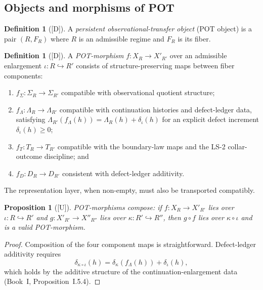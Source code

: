 \documentclass[12pt,oneside]{amsbook}
\theoremstyle{plain}
\newtheorem{proposition}[theorem]{Proposition}
\theoremstyle{definition}
\newtheorem{definition}[theorem]{Definition}
\theoremstyle{remark}
\newcommand{\status}[1]{\textup{[#1]}}
\begin{document}
\subsection*{Objects and morphisms of POT}

\begin{definition}[\status{D}]\label{def:POT-object}
A \emph{persistent observational-transfer object} (POT object) is a
pair $(R, F_R)$ where $R$ is an admissible regime and $F_R$ is its
fiber.
\end{definition}

\begin{definition}[\status{D}]\label{def:POT-morphism}
A \emph{POT-morphism} $f: X_R \to X'_{R'}$ over an admissible
enlargement $\iota: R \hookrightarrow R'$ consists of
structure-preserving maps between fiber components:
\begin{enumerate}[label=\textup{(\arabic*)}]
  \item $f_\Sigma: \Sigma_R \to \Sigma_{R'}$ compatible with
        observational quotient structure;
  \item $f_\Lambda: \Lambda_R \to \Lambda_{R'}$ compatible with
        continuation histories and defect-ledger data, satisfying
        $\Lambda_{R'}(f_\Lambda(h)) = \Lambda_R(h) + \delta_\iota(h)$
        for an explicit defect increment $\delta_\iota(h) \geq 0$;
  \item $f_T: T_R \to T_{R'}$ compatible with the boundary-law maps
        and the LS-2 collar-outcome discipline; and
  \item $f_D: D_R \to D_{R'}$ consistent with defect-ledger
        additivity.
\end{enumerate}
The representation layer, when non-empty, must also be transported
compatibly.
\end{definition}

\begin{proposition}[\status{U}]\label{prop:POT-compose}
POT-morphisms compose: if $f: X_R \to X'_{R'}$ lies over $\iota:
R \hookrightarrow R'$ and $g: X'_{R'} \to X''_{R''}$ lies over
$\kappa: R' \hookrightarrow R''$, then $g \circ f$ lies over $\kappa
\circ \iota$ and is a valid POT-morphism.
\end{proposition}

\begin{proof}
Composition of the four component maps is straightforward.
Defect-ledger additivity requires
\[
  \delta_{\kappa \circ \iota}(h)
  = \delta_\kappa(f_\Lambda(h)) + \delta_\iota(h),
\]
which holds by the additive structure of the continuation-enlargement
data (Book~I, Proposition~I.5.4).
\end{proof}
\end{document}
